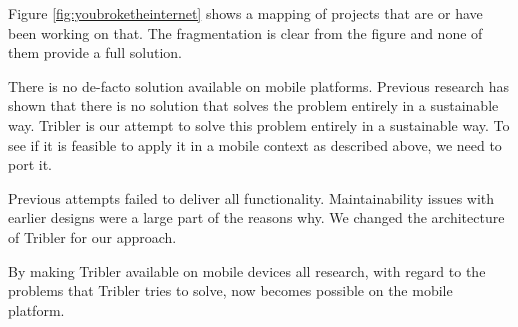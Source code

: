 Figure \ref{fig:youbroketheinternet} shows a mapping of projects that are or have been working on that.
The fragmentation is clear from the figure and none of them provide a full solution.



There is no de-facto solution available on mobile platforms. \cite{literature_survey}
Previous research has shown that there is no solution that solves the problem entirely in a sustainable way.
Tribler is our attempt to solve this problem entirely in a sustainable way.
To see if it is feasible to apply it in a mobile context as described above, we need to port it.

Previous attempts failed to deliver all functionality. \cite{bsc_1,2,3}
Maintainability issues with earlier designs were a large part of the reasons why.
We changed the architecture of Tribler for our approach.


By making Tribler available on mobile devices all research, with regard to the problems that Tribler tries to solve, now becomes possible on the mobile platform.
